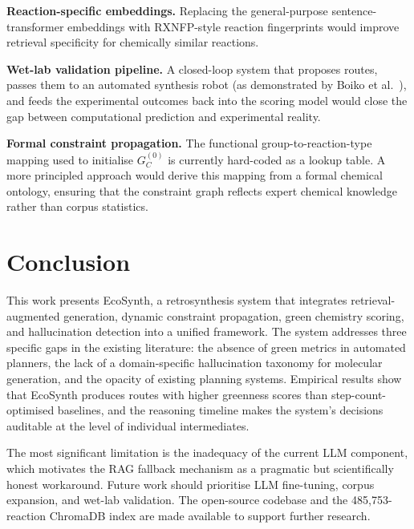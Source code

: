 \documentclass[12pt,a4paper]{article}
\begin{document}
\textbf{Reaction-specific embeddings.} Replacing the general-purpose
sentence-transformer embeddings with RXNFP-style \cite{schwaller2021rxnfp}
reaction fingerprints would improve retrieval specificity for
chemically similar reactions.

\textbf{Wet-lab validation pipeline.} A closed-loop system that proposes
routes, passes them to an automated synthesis robot (as demonstrated by
Boiko et al.~\cite{boiko2023autonomous}), and feeds the experimental outcomes
back into the scoring model would close the gap between computational
prediction and experimental reality.

\textbf{Formal constraint propagation.} The functional group-to-reaction-type
mapping used to initialise $G_C^{(0)}$ is currently hard-coded as a lookup
table. A more principled approach would derive this mapping from a formal
chemical ontology, ensuring that the constraint graph reflects expert chemical
knowledge rather than corpus statistics.

\section{Conclusion}

This work presents EcoSynth, a retrosynthesis system that integrates
retrieval-augmented generation, dynamic constraint propagation, green chemistry
scoring, and hallucination detection into a unified framework. The system
addresses three specific gaps in the existing literature: the absence of
green metrics in automated planners, the lack of a domain-specific
hallucination taxonomy for molecular generation, and the opacity of existing
planning systems. Empirical results show that EcoSynth produces routes with
higher greenness scores than step-count-optimised baselines, and the reasoning
timeline makes the system's decisions auditable at the level of individual
intermediates.

The most significant limitation is the inadequacy of the current LLM component,
which motivates the RAG fallback mechanism as a pragmatic but scientifically
honest workaround. Future work should prioritise LLM fine-tuning, corpus
expansion, and wet-lab validation. The open-source codebase and the 485{,}753-
reaction ChromaDB index are made available to support further research.



\end{document}
